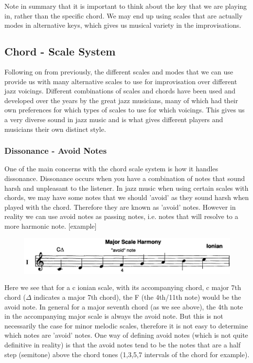 \documentclass[pdftex,12pt,a4paper]{report}
\begin{document}
Note in summary that it is important to think about the key that we are playing in, rather than the specific chord. We may end up using scales that are actually modes in alternative keys, which gives us musical variety in the improvisations.

\subsection{Chord - Scale System}
Following on from previously, the different scales and modes that we can use provide us with many alternative scales to use for improvisation over different jazz voicings. Different combinations of scales and chords have been used and developed over the years by the great jazz musicians, many of which had their own preferences for which types of scales to use for which voicings. This gives us a very diverse sound in jazz music and is what gives different players and musicians their own distinct style. 

\subsubsection{Dissonance - Avoid Notes} \label{avoidnotes}
One of the main concerns with the chord scale system is how it handles dissonance. Dissonance occurs when you have a combination of notes that sound harsh and unpleasant to the listener. In jazz music when using certain scales with chords, we may have some notes that we should 'avoid' as they sound harsh when played with the chord. Therefore they are known as 'avoid' notes. However in reality we can use avoid notes as passing notes, i.e. notes that will resolve to a more harmonic note. [example]

\begin{figure}[here]
  \centering
  \includegraphics[scale=0.4]{figure/cionian.png}
  \label{fig:cionian}
\end{figure}

Here we see that for a c ionian scale, with its accompanying chord, c major 7th chord ($\Delta$ indicates a major 7th chord), the F (the 4th/11th note) would be the avoid note.  In general for a major seventh chord (as we see above), the 4th note in the accompanying major scale is always the avoid note. But this is not necessarily the case for minor melodic scales, therefore it is not easy to determine which notes are 'avoid' notes. One way of defining avoid notes (which is not quite definitive in reality) is that the avoid notes tend to be the notes that are a half step (semitone) above the chord tones (1,3,5,7 intervals of the chord for example).
\end{document}
